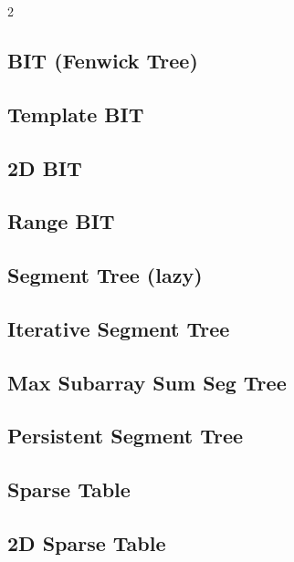 \documentclass[10pt,a4paper]{extarticle}
\begin{document}
\begin{landscape}
\begin{multicols}{2}
\subsection{BIT (Fenwick Tree)}


\subsection{Template BIT}


\subsection{2D BIT}


\subsection{Range BIT}


\subsection{Segment Tree (lazy)}


\subsection{Iterative Segment Tree}


\subsection{Max Subarray Sum Seg Tree}


\subsection{Persistent Segment Tree}


\subsection{Sparse Table}


\subsection{2D Sparse Table}



\end{multicols}
\end{landscape}
\end{document}
